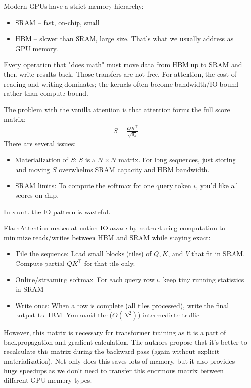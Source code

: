 Modern GPUs have a strict memory hierarchy:
\begin{itemize}
	\item SRAM – fast, on-chip, small
	\item HBM – slower than SRAM, large size. That's what we usually address as GPU memory.
\end{itemize}
Every operation that "does math" must move data from HBM up to SRAM and then write results back. Those transfers are not free. For attention, the cost of reading and writing dominates; the kernels often become bandwidth/IO-bound rather than compute-bound.

The problem with the vanilla attention is that attention forms the full score matrix:
\begin{align*}
	S = \frac{QK^\top}{\sqrt{d_k}}
\end{align*}
There are several issues:
\begin{itemize}
	\item Materialization of $S$: $S$ is a $N\times N$ matrix. For long sequences, just storing and moving $S$ overwhelms SRAM capacity and HBM bandwidth.
	\item SRAM limits: To compute the softmax for one query token $i$, you'd like all scores on chip.
\end{itemize}
In short: the IO pattern is wasteful.

FlashAttention makes attention IO-aware by restructuring computation to minimize reads/writes between HBM and SRAM while staying exact:
\begin{itemize}
	\item Tile the sequence: Load small blocks (tiles) of $Q, K$, and $V$ that fit in SRAM. Compute partial $QK^⊤$ for that tile only.
	\item Online/streaming softmax: For each query row $i$, keep tiny running statistics in SRAM
	\item Write once: When a row is complete (all tiles processed), write the final output to HBM. You avoid the ($O(N^2)$) intermediate traffic.
\end{itemize}

However, this matrix is necessary for transformer training as it is a part of backpropagation and gradient calculation. The authors propose that it's better to recalculate this matrix during the backward pass (again without explicit materialization). Not only does this saves lots of memory, but it also provides huge speedups as we don't need to transfer this enormous matrix between different GPU memory types.

